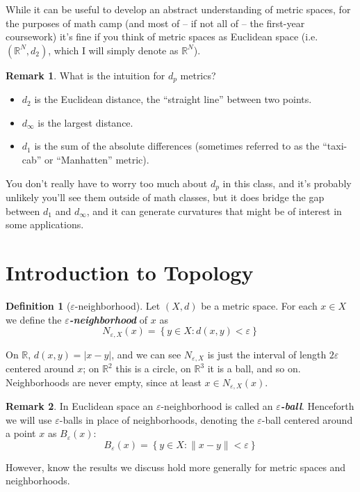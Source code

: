 \documentclass{article}
\newcommand{\norm}[1]{\lVert #1 \rVert}
\newcommand{\keyword}[1]{\textit{\textbf{#1}}\index{#1}}
\theoremstyle{definition}
\newtheorem{definition}{Definition}
\newtheorem{remark}{Remark}
\begin{document}
While it can be useful to develop an abstract understanding of metric spaces, for the purposes of math camp (and most of -- if not all of -- the first-year coursework) it's fine if you think of metric spaces as Euclidean space (i.e. $(\mathbb{R}^N, d_2)$, which I will simply denote as $\mathbb{R}^N$).
\begin{remark}
  What is the intuition for $d_p$ metrics?
  \begin{itemize}
    \item $d_2$ is the Euclidean distance, the ``straight line'' between two points.

    \item $d_{\infty}$ is the largest distance.

    \item $d_1$ is the sum of the absolute differences (sometimes referred to as the ``taxi-cab'' or ``Manhatten'' metric).
  \end{itemize}

  You don't really have to worry too much about $d_p$ in this class, and it's probably unlikely you'll see them outside of math classes, but it does bridge the gap between $d_1$ and $d_{\infty}$, and it can generate curvatures that might be of interest in some applications.
\end{remark}

\section{Introduction to Topology}
\begin{definition}[$\varepsilon$-neighborhood]\label{def:lecture1_neighborhood}
  Let $(X,d)$ be a metric space. For each $x \in X$ we define the \keyword{$\varepsilon$-neighborhood} of $x$ as
  \begin{equation*}
    N_{\varepsilon, X}(x) = \left\{ y \in X: d(x, y) < \varepsilon \right\}
  \end{equation*}
\end{definition}

On $\mathbb{R}$, $d(x,y) = |x-y|$, and we can see $N_{\varepsilon,X}$ is just the interval of length $2\varepsilon$ centered around $x$; on $\mathbb{R}^2$ this is a circle, on $\mathbb{R}^3$ it is a ball, and so on. Neighborhoods are never empty, since at least $x \in N_{\varepsilon, X}(x)$.

\begin{remark}
  In Euclidean space an $\varepsilon$-neighborhood is called an \keyword{$\varepsilon$-ball}. Henceforth we will use $\varepsilon$-balls in place of neighborhoods, denoting the $\varepsilon$-ball centered around a point $x$ as $B_{\varepsilon}(x)$:
  \begin{equation*}
    B_{\varepsilon}(x) = \left\{ y \in X: \norm{x - y} < \varepsilon \right\}
  \end{equation*}

  However, know the results we discuss hold more generally for metric spaces and neighborhoods.
\end{remark}
\end{document}
